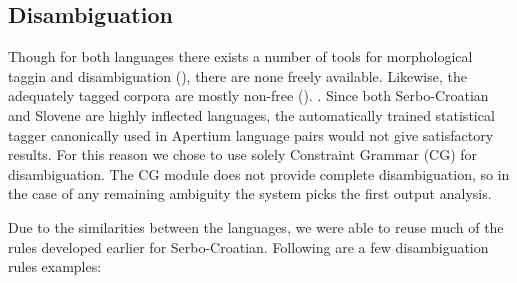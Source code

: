 
\subsection{Disambiguation}
Though for both languages there exists a number of tools for
morphological taggin and disambiguation (), there
are none freely available. Likewise, the adequately tagged corpora are
mostly non-free (). .  Since both Serbo-Croatian and Slovene are
highly inflected languages, the automatically trained statistical
tagger canonically used in Apertium language pairs would not give
satisfactory results. For this reason we chose to use solely
Constraint Grammar (CG) for disambiguation. The CG module does not
provide complete disambiguation, so in the case of any remaining
ambiguity the system picks the first output analysis.

Due to the similarities between the languages, we were able to
reuse much of the rules developed earlier for Serbo-Croatian. Following are
a few disambiguation rules examples:

